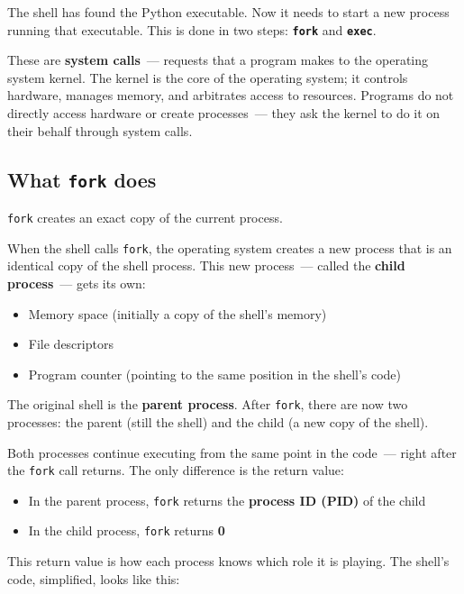 The shell has found the Python executable. Now it needs to start a new process running that executable. This is done in two steps: \textbf{\texttt{fork}} and \textbf{\texttt{exec}}.

These are \textbf{system calls}~--- requests that a program makes to the operating system kernel. The kernel is the core of the operating system; it controls hardware, manages memory, and arbitrates access to resources. Programs do not directly access hardware or create processes~--- they ask the kernel to do it on their behalf through system calls.

\subsection*{\texorpdfstring{What \texttt{fork} does}{What fork does}}\label{01-command-to-process:what-fork-does}

\texttt{fork} creates an exact copy of the current process.

When the shell calls \texttt{fork}, the operating system creates a new process that is an identical copy of the shell process. This new process~--- called the \textbf{child process}~--- gets its own:

\begin{itemize}
\tightlist
\item
  Memory space (initially a copy of the shell's memory)
\item
  File descriptors
\item
  Program counter (pointing to the same position in the shell's code)
\end{itemize}

\noindent{}The original shell is the \textbf{parent process}. After \texttt{fork}, there are now two processes: the parent (still the shell) and the child (a new copy of the shell).

Both processes continue executing from the same point in the code~--- right after the \texttt{fork} call returns. The only difference is the return value:

\begin{itemize}
\tightlist
\item
  In the parent process, \texttt{fork} returns the \textbf{process ID (PID)} of the child
\item
  In the child process, \texttt{fork} returns \textbf{0}
\end{itemize}

\noindent{}This return value is how each process knows which role it is playing. The shell's code, simplified, looks like this:

